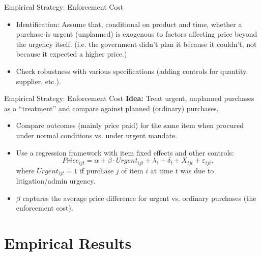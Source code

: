 \documentclass[aspectratio=169]{beamer}
\begin{document}
\begin{frame}{Empirical Strategy: Enforcement Cost}
   \begin{itemize}
   \item Identification: Assume that, conditional on product and time, whether a purchase is urgent (unplanned) is exogenous to factors affecting price beyond the urgency itself. (i.e. the government didn't plan it because it couldn't, not because it expected a higher price.)
    \item Check robustness with various specifications (adding controls for quantity, supplier, etc.).
  \end{itemize}
\end{frame}


\begin{frame}{Empirical Strategy: Enforcement Cost}
  \textbf{Idea:} Treat urgent, unplanned purchases as a ``treatment'' and compare against planned (ordinary) purchases.
  \medskip
  \begin{itemize}
    \item Compare outcomes (mainly price paid) for the same item when procured under normal conditions vs. under urgent mandate.
    \item Use a regression framework with item fixed effects and other controls:
          $$Price_{ijt} = \alpha + \beta \cdot Urgent_{ijt} + \lambda_{i} + \delta_{t} + X_{ijt} + \varepsilon_{ijt},$$
          where $Urgent_{ijt}=1$ if purchase $j$ of item $i$ at time $t$ was due to litigation/admin urgency.
    \item $\beta$ captures the average price difference for urgent vs. ordinary purchases (the enforcement cost).
  \end{itemize}
\end{frame}


\section{Empirical Results}
\end{document}
